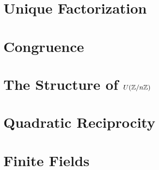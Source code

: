 \documentclass{mynotes}
\begin{document}
\tableofcontents
\chapter{Unique Factorization}






\chapter{Congruence}


\chapter{The Structure of $U(\mathbb{Z}/n\mathbb{Z})$}

\chapter{Quadratic Reciprocity}


\chapter{Finite Fields}



\end{document}
